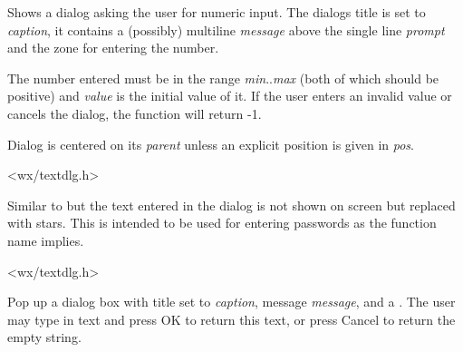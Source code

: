 \label{wxgetnumberfromuser}


Shows a dialog asking the user for numeric input. The dialogs title is set to 
{\it caption}, it contains a (possibly) multiline {\it message} above the
single line {\it prompt} and the zone for entering the number.

The number entered must be in the range {\it min}..{\it max} (both of which
should be positive) and {\it value} is the initial value of it. If the user
enters an invalid value or cancels the dialog, the function will return -1.

Dialog is centered on its {\it parent} unless an explicit position is given in 
{\it pos}.


<wx/textdlg.h>

\label{wxgetpasswordfromuser}


Similar to  but the text entered
in the dialog is not shown on screen but replaced with stars. This is intended
to be used for entering passwords as the function name implies.


<wx/textdlg.h>

\label{wxgettextfromuser}


Pop up a dialog box with title set to {\it caption}, message {\it message}, and a
.  The user may type in text and press OK to return this text,
or press Cancel to return the empty string.

